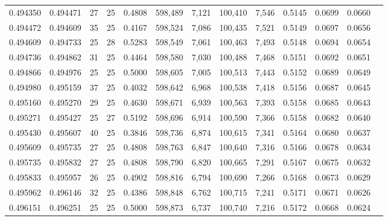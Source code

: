 \begin{tabular}{rrrrrrrrrrrrr}
0.494350 & 0.494471 &    27 &  25 &                                     0.4808 & 598,489 &   7,121 & 100,410 &   7,546 & 0.5145 & 0.0699 & 0.0660 \\
0.494472 & 0.494609 &    35 &  25 &                                     0.4167 & 598,524 &   7,086 & 100,435 &   7,521 & 0.5149 & 0.0697 & 0.0656 \\
0.494609 & 0.494733 &    25 &  28 &                                     0.5283 & 598,549 &   7,061 & 100,463 &   7,493 & 0.5148 & 0.0694 & 0.0654 \\
0.494736 & 0.494862 &    31 &  25 &                                     0.4464 & 598,580 &   7,030 & 100,488 &   7,468 & 0.5151 & 0.0692 & 0.0651 \\
0.494866 & 0.494976 &    25 &  25 &                                     0.5000 & 598,605 &   7,005 & 100,513 &   7,443 & 0.5152 & 0.0689 & 0.0649 \\
0.494980 & 0.495159 &    37 &  25 &                                     0.4032 & 598,642 &   6,968 & 100,538 &   7,418 & 0.5156 & 0.0687 & 0.0645 \\
0.495160 & 0.495270 &    29 &  25 &                                     0.4630 & 598,671 &   6,939 & 100,563 &   7,393 & 0.5158 & 0.0685 & 0.0643 \\
0.495271 & 0.495427 &    25 &  27 &                                     0.5192 & 598,696 &   6,914 & 100,590 &   7,366 & 0.5158 & 0.0682 & 0.0640 \\
0.495430 & 0.495607 &    40 &  25 &                                     0.3846 & 598,736 &   6,874 & 100,615 &   7,341 & 0.5164 & 0.0680 & 0.0637 \\
0.495609 & 0.495735 &    27 &  25 &                                     0.4808 & 598,763 &   6,847 & 100,640 &   7,316 & 0.5166 & 0.0678 & 0.0634 \\
0.495735 & 0.495832 &    27 &  25 &                                     0.4808 & 598,790 &   6,820 & 100,665 &   7,291 & 0.5167 & 0.0675 & 0.0632 \\
0.495833 & 0.495957 &    26 &  25 &                                     0.4902 & 598,816 &   6,794 & 100,690 &   7,266 & 0.5168 & 0.0673 & 0.0629 \\
0.495962 & 0.496146 &    32 &  25 &                                     0.4386 & 598,848 &   6,762 & 100,715 &   7,241 & 0.5171 & 0.0671 & 0.0626 \\
0.496151 & 0.496251 &    25 &  25 &                                     0.5000 & 598,873 &   6,737 & 100,740 &   7,216 & 0.5172 & 0.0668 & 0.0624 \\

\end{tabular}
